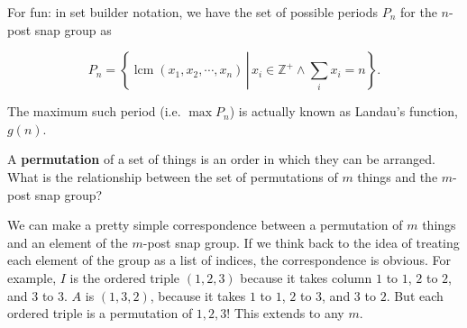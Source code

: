 \documentclass[../gatm_answers.tex]{subfiles}
\begin{document}
For fun: in set builder notation, we have the set of possible periods $P_n$ for the $n$-post snap group as

$$P_n=\left\{\operatorname{lcm} (x_1, x_2, \cdots, x_n)\, \left|\,x_i\in\mathbb{Z}^+ \land \sum_i x_i=n\right.\right\}.$$

\noindent The maximum such period (i.e. $\max P_n$) is actually known as Landau's function, $g(n)$.

\begin{outer_problem}
	\item A \textbf{permutation} of a set of things is an order in which they can be arranged. What is the relationship between the set of permutations of $m$ things and the $m$-post snap group?
\end{outer_problem}

\noindent We can make a pretty simple correspondence between a permutation of $m$ things and an element of the $m$-post snap group. If we think back to the idea of treating each element of the group as a list of indices, the correspondence is obvious. For example, $I$ is the ordered triple $(1,2,3)$ because it takes column $1$ to $1$, $2$ to $2$, and $3$ to $3$. $A$ is $(1,3,2)$, because it takes $1$ to $1$, $2$ to $3$, and $3$ to $2$. But each ordered triple is a permutation of ${1,2,3}$! This extends to any $m$.
\end{document}

